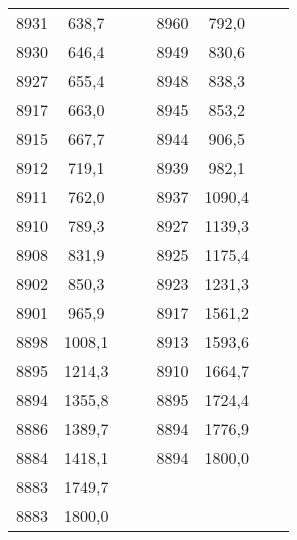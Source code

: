\documentclass[11pt]{article}
\begin{document}
{{\begin{tabular}{|c|c|c|c|c|c|c|c|}
            \cline{1-2} \cline{5-6} 
            8931 & 638,7 &  &  & 8960 & 792,0 &  & \tabularnewline
            \cline{1-2} \cline{5-6} 
            8930 & 646,4 &  &  & 8949 & 830,6 &  & \tabularnewline
            \cline{1-2} \cline{5-6} 
            8927 & 655,4 &  &  & 8948 & 838,3 &  & \tabularnewline
            \cline{1-2} \cline{5-6} 
            8917 & 663,0 &  &  & 8945 & 853,2 &  & \tabularnewline
            \cline{1-2} \cline{5-6} 
            8915 & 667,7 &  &  & 8944 & 906,5 &  & \tabularnewline
            \cline{1-2} \cline{5-6} 
            8912 & 719,1 &  &  & 8939 & 982,1 &  & \tabularnewline
            \cline{1-2} \cline{5-6} 
            8911 & 762,0 &  &  & 8937 & 1090,4 &  & \tabularnewline
            \cline{1-2} \cline{5-6} 
            8910 & 789,3 &  &  & 8927 & 1139,3 &  & \tabularnewline
            \cline{1-2} \cline{5-6} 
            8908 & 831,9 &  &  & 8925 & 1175,4 &  & \tabularnewline
            \cline{1-2} \cline{5-6} 
            8902 & 850,3 &  &  & 8923 & 1231,3 &  & \tabularnewline
            \cline{1-2} \cline{5-6} 
            8901 & 965,9 &  &  & 8917 & 1561,2 &  & \tabularnewline
            \cline{1-2} \cline{5-6} 
            8898 & 1008,1 &  &  & 8913 & 1593,6 &  & \tabularnewline
            \cline{1-2} \cline{5-6} 
            8895 & 1214,3 &  &  & 8910 & 1664,7 &  & \tabularnewline
            \cline{1-2} \cline{5-6} 
            8894 & 1355,8 &  &  & 8895 & 1724,4 &  & \tabularnewline
            \cline{1-2} \cline{5-6} 
            8886 & 1389,7 &  &  & 8894 & 1776,9 &  & \tabularnewline
            \cline{1-2} \cline{5-6} 
            8884 & 1418,1 &  &  & 8894 & 1800,0 &  & \tabularnewline
            \cline{1-2} \cline{5-6} 
            8883 & 1749,7 &  & \multicolumn{1}{c}{} & \multicolumn{1}{c}{} & \multicolumn{1}{c}{} &  & \tabularnewline
            \cline{1-2} 
            8883 & 1800,0 &  & \multicolumn{1}{c}{} & \multicolumn{1}{c}{} & \multicolumn{1}{c}{} &  & \tabularnewline
            \cline{1-2} 
        \end{tabular}
    }
}
\vspace*{\fill}
\end{document}
